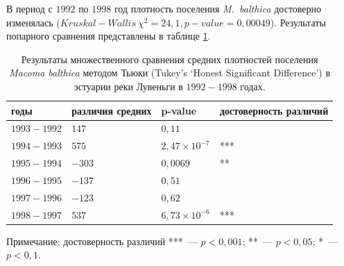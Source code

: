 В период с $1992$ по $1998$ год плотность поселения {\it M.~balthica} достоверно изменялась ($Kruskal-Wallis\ \chi^2 = 24,1, p-value = 0,00049$). Результаты попарного сравнения представлены в таблице \ref{tab:Tukey_estuary_92_98_n2}.

	\begin{table}[p]
	\caption{Результаты множественного сравнения средних плотностей поселения {\it Macoma balthica} методом Тьюки (Tukey's ‘Honest Significant Difference’) в эстуарии реки Лувеньги в $1992-1998$ годах.}
	\label{tab:Tukey_estuary_92_98_n2}
	\begin{tabularx}{\textwidth}{|*{4}{X|}} \hline
	годы & различия средних & p-value & достоверность различий\\
	\hline
	$1993-1992$ & $147$ &  $0,11$ & \\
	\hline
	$1994-1993$ & $575$  & $2,47 \times 10^{-7}$ & *** \\
	\hline
	$1995-1994$ & $-303$  & $0,0069$ & ** \\
	\hline
	$1996-1995$ & $-137$  & $0,51$ & \\
	\hline
	$1997-1996$ & $-123$  & $0,62$ & \\
	\hline
	$1998-1997$ & $537$  & $6,73 \times 10^{-6}$ & *** \\
	\hline
	\end{tabularx}

	{\footnotesize Примечание: достоверность различий ***~--- $p<0,001$; **~--- $p<0,05$; *~--- $p<0,1$.}
	\end{table}

